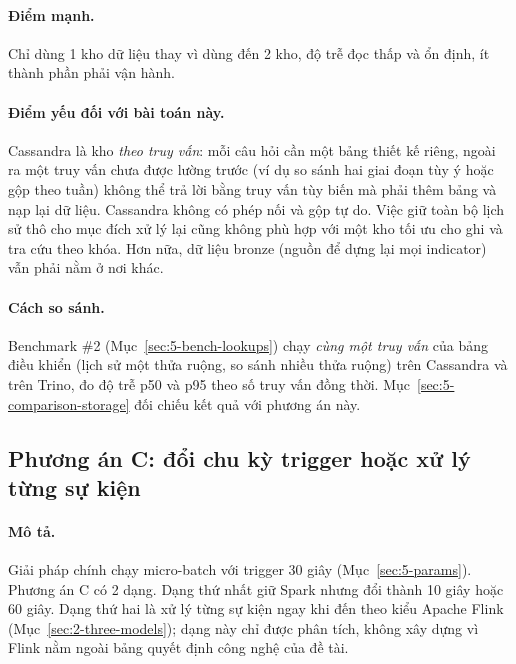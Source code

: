 \paragraph{Điểm mạnh.} Chỉ dùng 1 kho dữ liệu thay vì dùng đến 2 kho, độ trễ đọc thấp và ổn định, ít thành phần phải vận hành.

\paragraph{Điểm yếu đối với bài toán này.} Cassandra là kho \emph{theo truy vấn}: mỗi câu hỏi cần một bảng thiết kế riêng, ngoài ra một truy vấn chưa được lường trước (ví dụ so sánh hai giai đoạn tùy ý hoặc gộp theo tuần) không thể trả lời bằng truy vấn tùy biến mà phải thêm bảng và nạp lại dữ liệu. Cassandra không có phép nối và gộp tự do. Việc giữ toàn bộ lịch sử thô cho mục đích xử lý lại cũng không phù hợp với một kho tối ưu cho ghi và tra cứu theo khóa. Hơn nữa, dữ liệu bronze (nguồn để dựng lại mọi indicator) vẫn phải nằm ở nơi khác.

\paragraph{Cách so sánh.} Benchmark \#2 (Mục~\ref{sec:5-bench-lookups}) chạy \emph{cùng một truy vấn} của bảng điều khiển (lịch sử một thửa ruộng, so sánh nhiều thửa ruộng) trên Cassandra và trên Trino, đo độ trễ p50 và p95 theo số truy vấn đồng thời. Mục~\ref{sec:5-comparison-storage} đối chiếu kết quả với phương án này.

\subsection{Phương án C: đổi chu kỳ trigger hoặc xử lý từng sự kiện}
\label{sec:4-alt-trigger}

\paragraph{Mô tả.} Giải pháp chính chạy micro-batch với trigger 30 giây (Mục~\ref{sec:5-params}). Phương án C có 2 dạng. Dạng thứ nhất giữ Spark nhưng đổi  thành 10 giây hoặc 60 giây. Dạng thứ hai là xử lý từng sự kiện ngay khi đến theo kiểu Apache Flink (Mục~\ref{sec:2-three-models}); dạng này chỉ được phân tích, không xây dựng vì Flink nằm ngoài bảng quyết định công nghệ của đề tài.

